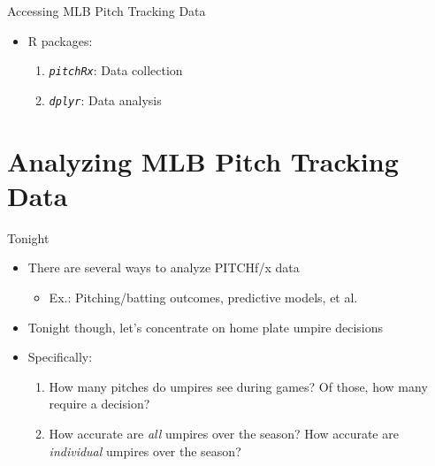 \begin{frame}[fragile]{Accessing MLB Pitch Tracking Data}

\begin{itemize}
\tightlist
\item
  R packages:

  \begin{enumerate}
  \def\labelenumi{\arabic{enumi}.}
  \tightlist
  \item
    \emph{\texttt{pitchRx}}: Data collection
  \item
    \emph{\texttt{dplyr}}: Data analysis
  \end{enumerate}
\end{itemize}

\end{frame}

\section{Analyzing MLB Pitch Tracking
Data}\label{analyzing-mlb-pitch-tracking-data}

\begin{frame}{Tonight}

\begin{itemize}
\tightlist
\item
  There are several ways to analyze PITCHf/x data

  \begin{itemize}
  \tightlist
  \item
    Ex.: Pitching/batting outcomes, predictive models, et al.
  \end{itemize}
\item
  Tonight though, let's concentrate on home plate umpire decisions
\item
  Specifically:

  \begin{enumerate}
  \def\labelenumi{\arabic{enumi}.}
  \tightlist
  \item
    How many pitches do umpires see during games? Of those, how many
    require a decision?
  \item
    How accurate are \emph{all} umpires over the season? How accurate
    are \emph{individual} umpires over the season?
  \end{enumerate}
\end{itemize}

\end{frame}

